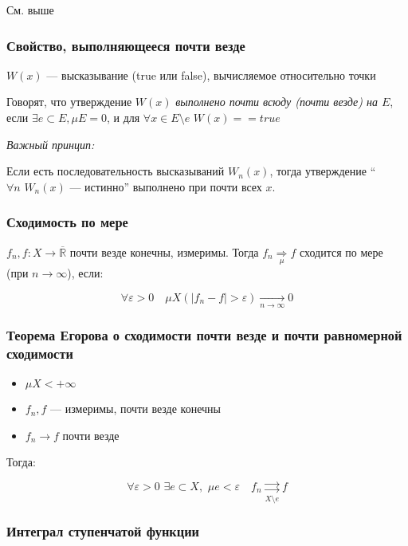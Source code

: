 \documentclass{article}
\def\dbl{\,\,}
\def\rsh#1{\underset{#1}{\rightrightarrows}}
\begin{document}
См. выше

\subsubsection{Свойство, выполняющееся почти везде}

$W(x)$ --- высказывание (true или false), вычисляемое относительно точки

Говорят, что утверждение $W(x)$ \textit{выполнено почти всюду (почти везде) на $E$}, если $\exists e \subset E, \mu E = 0$, и для $\forall x \in E \setminus e \dbl W(x) == true$

\textit{Важный принцип:}

Если есть последовательность высказываний $W_n(x)$, тогда утверждение ``$\forall n \dbl W_n(x)$ --- истинно'' выполнено при почти всех $x$.

\subsubsection{Сходимость по мере}

$f_n, f: X \rightarrow \overline{\mathbb{R}}$ почти везде конечны, измеримы. Тогда $f_n \underset{\mu}{\Longrightarrow} f$ сходится по мере (при $n \rightarrow \infty$), если: 

\[\forall \varepsilon > 0 \quad \mu X(|f_n - f| > \varepsilon) \underset{n \rightarrow \infty}{\longrightarrow} 0\]

\subsubsection{Теорема Егорова о сходимости почти везде и почти равномерной сходимости}

\begin{itemize}
    \item $\mu X < + \infty$
    \item $f_n, f$ --- измеримы, почти везде конечны
    \item $f_n \rightarrow f$ почти везде
\end{itemize}

Тогда:

\[\forall \varepsilon > 0 \dbl \exists e \subset X, \dbl \mu e < \varepsilon \quad f_n \rsh{X \setminus e} f\]

\subsubsection{Интеграл ступенчатой функции}
\end{document}
